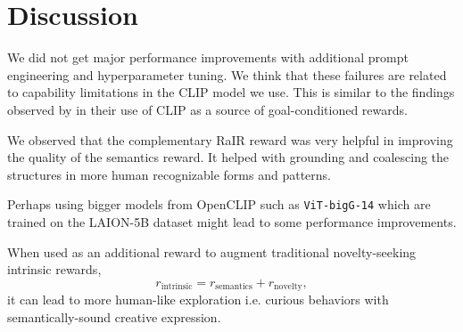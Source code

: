 \chapter{Discussion}
\label{sec:discussion}


We did not get major performance improvements with additional prompt engineering and hyperparameter tuning.
We think that these failures are related to capability limitations in the CLIP model we use.
This is similar to the findings observed by \cite{vlmrm} in their use of CLIP as a source of goal-conditioned rewards.


We observed that the complementary RaIR reward was very helpful in improving the quality of the semantics reward.
It helped with grounding and coalescing the structures in more human recognizable forms and patterns.


Perhaps using bigger models from OpenCLIP such as \texttt{ViT-bigG-14} \citep{openclip} which are trained on the LAION-5B dataset \cite{laion5b} might lead to some performance improvements.


When used as an additional reward to augment traditional novelty-seeking intrinsic rewards, 
\begin{equation}
    \label{eq:intrinsic-reward}
    r_{\text{intrinsic}} = r_{\text{semantics}} + r_{\text{novelty}},
\end{equation}
it can lead to more human-like exploration i.e. curious behaviors with semantically-sound creative expression.
